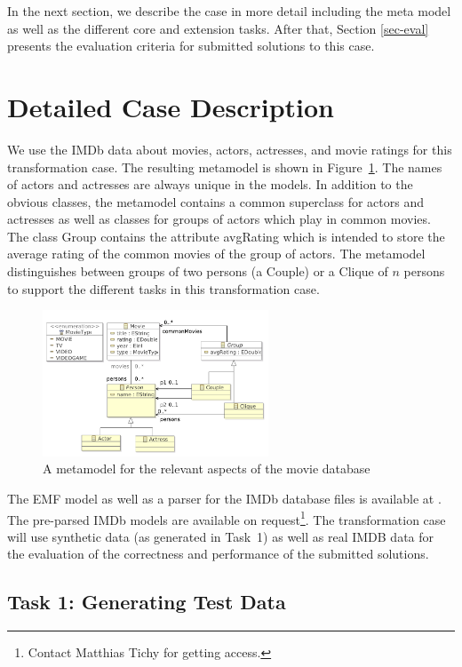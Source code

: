 \documentclass[a4paper,11pt]{article}
\newcommand{\p}[1]{\textsf{\small #1}}
\begin{document}
In the next section, we describe the case in more detail
including the meta model as well as the different core and extension
tasks. After that, Section \ref{sec-eval} presents the evaluation
criteria for submitted solutions to this case.


\section{Detailed Case Description}\label{sec-case}

We use the IMDb data about movies, actors, actresses, and movie ratings for
this transformation case. The resulting metamodel is shown in
Figure~\ref{fig:metamodel}.  The names of actors and actresses are always
unique in the models.  In addition to the obvious classes, the metamodel
contains a common superclass for actors and actresses as well as classes for
groups of actors which play in common movies. The class \p{Group} contains the
attribute \p{avgRating} which is intended to store the average rating of the
common movies of the group of actors. The metamodel distinguishes between
groups of two persons (a \p{Couple}) or a \p{Clique} of $n$ persons to support
the different tasks in this transformation case.

\begin{figure}[ht]
\centering
\includegraphics[width=0.6\textwidth]{movies}
\caption{A metamodel for the relevant aspects of the movie database}
\label{fig:metamodel}
\end{figure}

The EMF model as well as a parser for the IMDb database files is available at
\cite{IMDB2EMF}. The pre-parsed IMDb models are available on
request\footnote{\label{imdb-access}Contact Matthias Tichy for getting
  access.}. The transformation case will use synthetic data (as generated in
Task~1) as well as real IMDB data for the evaluation of the correctness and
performance of the submitted solutions.


\subsection{Task 1: Generating Test Data}
\label{sec:gen-test-data}
\end{document}
